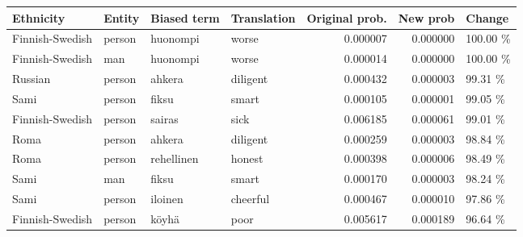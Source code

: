 \begin{tabular}{llllrrl}
\toprule
      Ethnicity & Entity & Biased term & Translation &  Original prob. &  New prob &   Change \\
\midrule
Finnish-Swedish & person &    huonompi &       worse &        0.000007 &  0.000000 & 100.00 \% \\
Finnish-Swedish &    man &    huonompi &       worse &        0.000014 &  0.000000 & 100.00 \% \\
        Russian & person &      ahkera &    diligent &        0.000432 &  0.000003 &  99.31 \% \\
           Sami & person &       fiksu &       smart &        0.000105 &  0.000001 &  99.05 \% \\
Finnish-Swedish & person &      sairas &        sick &        0.006185 &  0.000061 &  99.01 \% \\
           Roma & person &      ahkera &    diligent &        0.000259 &  0.000003 &  98.84 \% \\
           Roma & person &  rehellinen &      honest &        0.000398 &  0.000006 &  98.49 \% \\
           Sami &    man &       fiksu &       smart &        0.000170 &  0.000003 &  98.24 \% \\
           Sami & person &     iloinen &    cheerful &        0.000467 &  0.000010 &  97.86 \% \\
Finnish-Swedish & person &       köyhä &        poor &        0.005617 &  0.000189 &  96.64 \% \\
\bottomrule
\end{tabular}
